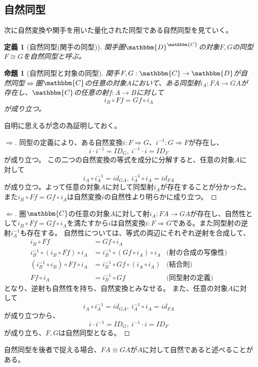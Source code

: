 \documentclass[uplatex,dvipdfmx]{jsarticle}
\newcommand{\cat}[1]{\mathbbm{#1}}
\newcommand{\arrow}{\rightarrow}
\newcommand{\functor}[3]{#1:\cat{#2}\arrow \cat{#3}}
\newcommand{\nat}[3]{#1:#2\Rightarrow #3}
\newcommand{\mor}[3]{#1:#2\arrow #3}
\newcommand{\funccat}[2]{\cat{#2}^\cat{#1}}
\newtheorem{proof}{証明}[section]
\newtheorem{prop}{命題}[section]
\newtheorem{define}{定義}[section]
\numberwithin{proof}{subsection}
\numberwithin{prop}{subsection}
\numberwithin{define}{subsection}
\begin{document}
	\subsection{自然同型}
  次に自然変換や関手を用いた量化された同型である自然同型を見ていく。
  \begin{define}[自然同型(関手の同型)]
    関手圏$\funccat{C}{D}$の対象$F,G$の同型$F\cong G$を自然同型と呼ぶ。
  \end{define}
  \begin{prop}[自然同型と対象の同型]
    関手$\functor{F,G}{C}{D}$が自然同型$\iff$圏$\cat{C}$の任意の対象$A$において、ある同型射$\mor{i_A}{FA}{GA}$が存在し、$\cat{C}$の任意の射$\mor{f}{A}{B}$に対して\[i_B\circ Ff=Gf\circ i_A\]が成り立つ。
  \end{prop}
  自明に思えるが念の為証明しておく。
  \begin{proof}[$\Longrightarrow$]
    同型の定義により、ある自然変換$\nat{i}{F}{G}$、$\nat{i^{-1}}{G}{F}$が存在し、\[i\cdot i^{-1}=ID_G,\ i^{-1}\cdot i=ID_F\]が成り立つ。
    この二つの自然変換の等式を成分に分解すると、任意の対象$A$に対して\[i_A\circ i^{-1}_A=id_{GA},\ i^{-1}_A\circ i_A=id_{FA}\]が成り立つ。よって任意の対象$A$に対して同型射$i_A$が存在することが分かった。
    また$i_B\circ Ff=Gf\circ i_A$は自然変換$i$の自然性より明らかに成り立つ。
  \end{proof}
  \begin{proof}[$\Longleftarrow$]
    圏$\cat{C}$の任意の対象$A$に対して射$\mor{i_A}{FA}{GA}$が存在し、自然性として$i_B\circ Ff=Gf\circ i_A$を満たすから$i$は自然変換$\nat{i}{F}{G}$である。また同型射の逆射$i^{-1}_A$も存在する。
    自然性については、等式の両辺にそれぞれ逆射を合成して、
    \begin{align*}
      i_B\circ Ff &=Gf\circ i_A\\
      i^{-1}_B\circ (i_B\circ Ff)\circ i_A &=i^{-1}_B\circ(Gf\circ i_A)\circ i_A&\text{(射の合成の写像性)}\\
      (i^{-1}_B\circ i_B)\circ Ff\circ i_A &=i^{-1}_B\circ Gf\circ (i_A\circ i_A)&\text{(結合則)}\\
      Ff\circ i_A&=i^{-1}_B\circ Gf&\text{(同型射の定義)}
    \end{align*}
    となり、逆射も自然性を持ち、自然変換とみなせる。
    また、任意の対象$A$に対して\[i_A\circ i^{-1}_A=id_{GA},\ i^{-1}_A\circ i_A=id_{FA}\]が成り立つから、\[i\cdot i^{-1}=ID_G,\ i^{-1}\cdot i=ID_F\]が成り立ち、$F,G$は自然同型となる。
  \end{proof}
  自然同型を後者で捉える場合、$FA\cong GA$が$A$に対して自然であると述べることがある。
\end{document}
